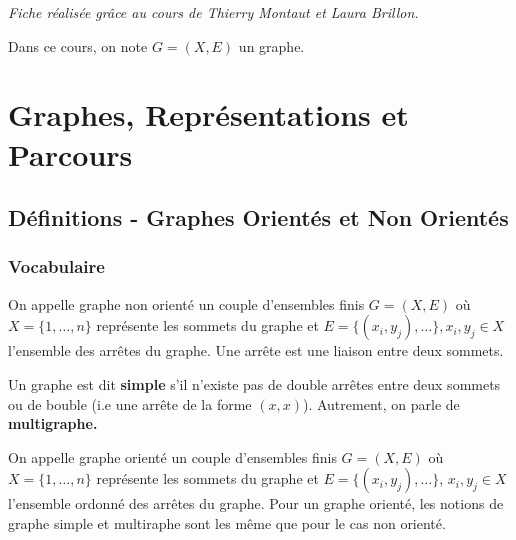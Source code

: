 
\minitoc 


\emph{Fiche réalisée grâce au cours de Thierry Montaut et Laura Brillon.}

Dans ce cours, on note $G = (X,E)$ un graphe.


\section{Graphes, Représentations et Parcours}

\subsection{Définitions - Graphes Orientés et Non Orientés}

\subsubsection{Vocabulaire}

\begin{definition}
    On appelle graphe non orienté un couple d'ensembles finis $G = (X,E)$ où $X = \{1, \dots, n\}$ représente les sommets du graphe
    et $E = \{ (x_i, y_j), \dots \}, x_i, y_j \in X$ l'ensemble des arrêtes du graphe. Une arrête est une liaison entre deux sommets.

    Un graphe est dit \textbf{simple} s'il n'existe pas de double arrêtes entre deux sommets ou de bouble (i.e une arrête de la forme $(x,x)$).
    Autrement, on parle de \textbf{multigraphe.}
\end{definition}

\begin{definition}
    On appelle graphe orienté un couple d'ensembles finis $G = (X,E)$ où $X = \{1, \dots, n\}$ représente les sommets du graphe 
    et $E = \{ (x_i, y_j), \dots \}$, $ x_i, y_j \in X$ l'ensemble ordonné des arrêtes du graphe. 
    Pour un graphe orienté, les notions de graphe simple et multiraphe sont les même que pour le cas non orienté.
\end{definition}

